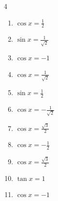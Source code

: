 \begin{multicols}{4}
\begin{enumerate}
  \item $\displaystyle \cos{x}  = \frac{1}{2}$


  \item $\displaystyle \sin{x}  = \frac{1}{\sqrt{2}}$


  \item $\displaystyle \cos{x}  = -1$

        \phantom{$\displaystyle x = \pi$}

  \item $\displaystyle \cos{x}  = \frac{1}{\sqrt{2}}$


  \item $\displaystyle \sin{x}  = \frac{1}{2}$


  \item $\displaystyle \cos{x}  = -\frac{1}{\sqrt{2}}$


  \item $\displaystyle \cos{x}  = \frac{\sqrt{3}}{2}$


  \item $\displaystyle \cos{x}  = -\frac{1}{2}$


  \item $\displaystyle \cos{x}  = \frac{\sqrt{3}}{2}$


  \item $\displaystyle \tan{x}  = 1$


\columnbreak %

  \item $\displaystyle \cos{x}  = -1$

        \phantom{$\displaystyle x = \pi$}


\end{enumerate}
\end{multicols}
